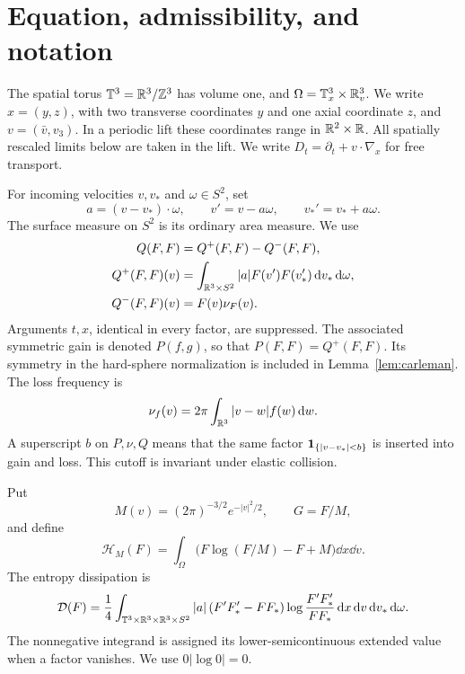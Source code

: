 \section{Equation, admissibility, and notation}\label{sec:framework}

The spatial torus \(\mathbb T^3=\mathbb R^3/\mathbb Z^3\) has volume one, and
\(\Omega=\mathbb T^3_x\times\mathbb R^3_v\). We write \(x=(y,z)\), with two transverse
coordinates \(y\) and one axial coordinate \(z\), and
\(v=(\bar v,v_3)\). In a periodic lift these coordinates range in
\(\mathbb R^2\times\mathbb R\). All spatially rescaled limits below are taken in the lift.
We write \(D_t=\partial_t+v\cdot\nabla_x\) for free transport.

For incoming velocities \(v,v_*\) and \(\omega\in S^2\), set
\[
a=(v-v_*)\cdot\omega,\qquad
v'=v-a\omega,\qquad v_*'=v_*+a\omega.
\]
The surface measure on \(S^2\) is its ordinary area measure. We use
\begin{equation}\label{eq:collision}
\begin{split}
Q(F,F)&=Q^+(F,F)-Q^-(F,F),\\
Q^+(F,F)(v)&=\int_{\mathbb R^3\times S^2}|a|F(v')F(v_*')\,\mathrm d v_*\,\mathrm d\omega,\\
Q^-(F,F)(v)&=F(v)\nu_F(v).
\end{split}
\end{equation}
Arguments \(t,x\), identical in every factor, are suppressed.
The associated symmetric gain is denoted \(P(f,g)\), so that
\(P(F,F)=Q^+(F,F)\). Its symmetry in the hard-sphere normalization is
included in Lemma~\ref{lem:carleman}. The loss frequency is
\begin{equation}\label{eq:frequency}
\nu_f(v)=2\pi\int_{\mathbb R^3}|v-w|f(w)\,\mathrm d w.
\end{equation}
A superscript \(b\) on \(P,\nu,Q\) means that the same factor
\(\mathbf 1_{\{|v-v_*|<b\}}\) is inserted into gain and loss.
This cutoff is invariant under elastic collision.

Put
\[
M(v)=(2\pi)^{-3/2}e^{-|v|^2/2},\qquad G=F/M,
\]
and define
\[
\mathcal H_M(F)=\int_\Omega
 \bigl(F\log(F/M)-F+M\bigr)\dd x\dd v.
\]
The entropy dissipation is
\[
\mathcal D(F)=\frac14
\int_{\mathbb T^3\times\mathbb R^3\times\mathbb R^3\times S^2}
|a|\,(F'F_*'-FF_*)\log\frac{F'F_*'}{FF_*}
 \,\mathrm d x\,\mathrm d v\,\mathrm d v_*\,\mathrm d\omega.
\]
The nonnegative integrand is assigned its lower-semicontinuous
extended value when a factor vanishes. We use \(0|\log0|=0\).

